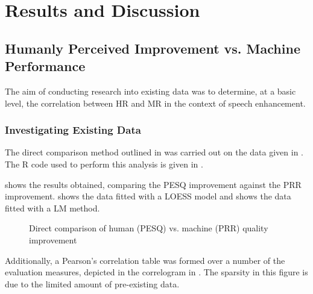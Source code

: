 
\chapter{Results and Discussion}

\acresetall


\section{Humanly Perceived Improvement vs. Machine Performance}

The aim of conducting research into existing data was to determine,
at a basic level, the correlation between \ac{HR} and \ac{MR} in
the context of speech enhancement.


\subsection{Investigating Existing Data}

The direct comparison method outlined in 
was carried out on the data given in  \textit{}.
The R code used to perform this analysis is given in .

 shows the results obtained, comparing the
\ac{PESQ} improvement against the \ac{PRR} improvement. 
shows the data fitted with a \acf{LOESS} model and 
shows the data fitted with a \acf{LM} method.

\begin{figure}[p]

\protect\caption{\label{fig:Direct-PESQ-PRR}Direct comparison of human (\acs{PESQ})
vs. machine (\acs{PRR}) quality improvement}
\end{figure}


Additionally, a Pearson's correlation table was formed over a number
of the evaluation measures, depicted in the correlogram in .
The sparsity in this figure is due to the limited amount of pre-existing
data.

